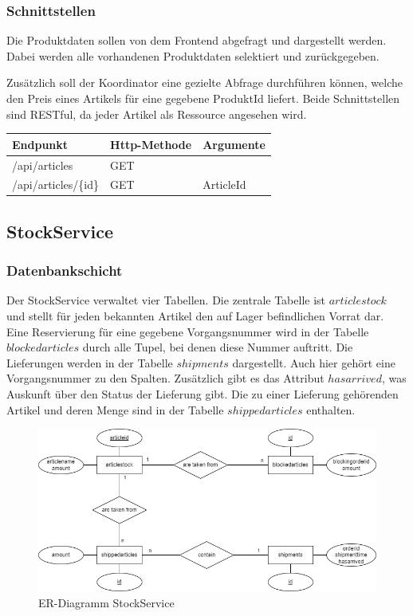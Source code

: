 \subsubsection{Schnittstellen} %
Die Produktdaten sollen von dem Frontend abgefragt und dargestellt werden. Dabei werden alle vorhandenen Produktdaten selektiert und zurückgegeben. 

Zusätzlich soll der Koordinator eine gezielte Abfrage durchführen können, welche den Preis eines Artikels für eine gegebene ProduktId liefert. Beide Schnittstellen sind RESTful, da jeder Artikel als Ressource angesehen wird. 

\begin{center}
	\begin{tabular}[h]{|p{3.5cm}|p{3cm}|p{2cm}|}
	\hline
	Endpunkt & Http-Methode & Argumente \\ \hline
	/api/articles & GET & \\ \hline
	/api/articles/\{id\} & GET & ArticleId \\ \hline
\end{tabular}
\end{center}
\FloatBarrier

\subsection{StockService}
\subsubsection{Datenbankschicht}

Der StockService verwaltet vier Tabellen. Die zentrale Tabelle ist $articlestock$ und stellt für jeden bekannten Artikel den auf Lager befindlichen Vorrat dar. Eine Reservierung für eine gegebene Vorgangsnummer wird in der Tabelle $blockedarticles$ durch alle Tupel, bei denen diese Nummer auftritt. Die Lieferungen werden in der Tabelle $shipments$ dargestellt. Auch hier gehört eine Vorgangsnummer zu den Spalten. Zusätzlich gibt es das Attribut $hasarrived$, was Auskunft über den Status der Lieferung gibt. Die zu einer Lieferung gehörenden Artikel und deren Menge sind in der Tabelle $shippedarticles$ enthalten.

\begin{figure}[h!]
	\centering
	\includegraphics[scale=0.5]{figures/DatabaseER/StockServiceTables.png}
	\caption{ER-Diagramm StockService}
\end{figure}
\FloatBarrier


